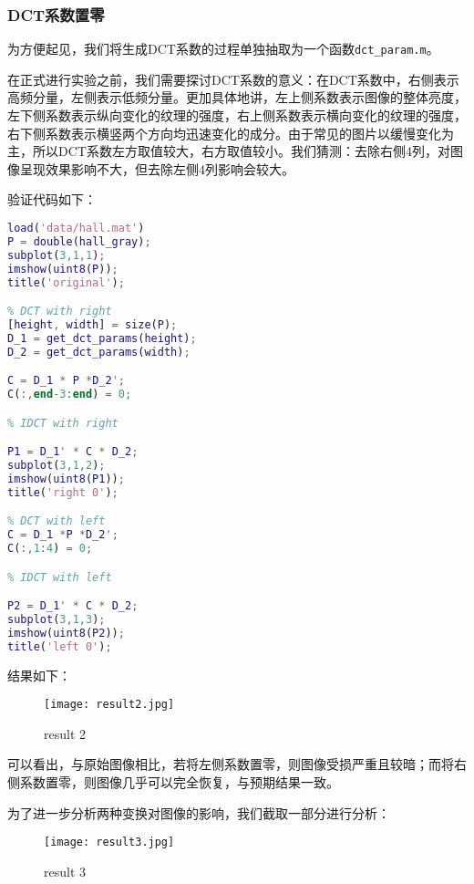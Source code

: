 \documentclass[a4paper]{article}
\begin{document}
\subsubsection{DCT系数置零}
\par 为方便起见，我们将生成DCT系数的过程单独抽取为一个函数\lstinline{dct_param.m}。
\par 在正式进行实验之前，我们需要探讨DCT系数的意义：在DCT系数中，右侧表示高频分量，左侧表示低频分量。更加具体地讲，左上侧系数表示图像的整体亮度，左下侧系数表示纵向变化的纹理的强度，右上侧系数表示横向变化的纹理的强度，右下侧系数表示横竖两个方向均迅速变化的成分。由于常见的图片以缓慢变化为主，所以DCT系数左方取值较大，右方取值较小。我们猜测：去除右侧4列，对图像呈现效果影响不大，但去除左侧4列影响会较大。
\par 验证代码如下：
\begin{lstlisting}[language=matlab, caption=DCT置零方式比较]
load('data/hall.mat')
P = double(hall_gray);
subplot(3,1,1);
imshow(uint8(P));
title('original');

% DCT with right
[height, width] = size(P);
D_1 = get_dct_params(height);
D_2 = get_dct_params(width);

C = D_1 * P *D_2';
C(:,end-3:end) = 0;

% IDCT with right

P1 = D_1' * C * D_2;
subplot(3,1,2);
imshow(uint8(P1));
title('right 0');

% DCT with left
C = D_1 *P *D_2';
C(:,1:4) = 0;

% IDCT with left

P2 = D_1' * C * D_2;
subplot(3,1,3);
imshow(uint8(P2));
title('left 0');
\end{lstlisting}

\par 结果如下：

\begin{figure}[ht]
     \centering
     \texttt{[image: result2.jpg]}
     \caption{result 2}
    \label{fig:result 2}
\end{figure}

\par 可以看出，与原始图像相比，若将左侧系数置零，则图像受损严重且较暗；而将右侧系数置零，则图像几乎可以完全恢复，与预期结果一致。

\par 为了进一步分析两种变换对图像的影响，我们截取一部分进行分析：

\begin{figure}[ht]
     \centering
     \texttt{[image: result3.jpg]}
     \caption{result 3}
    \label{fig:result 3}
\end{figure}
\end{document}
